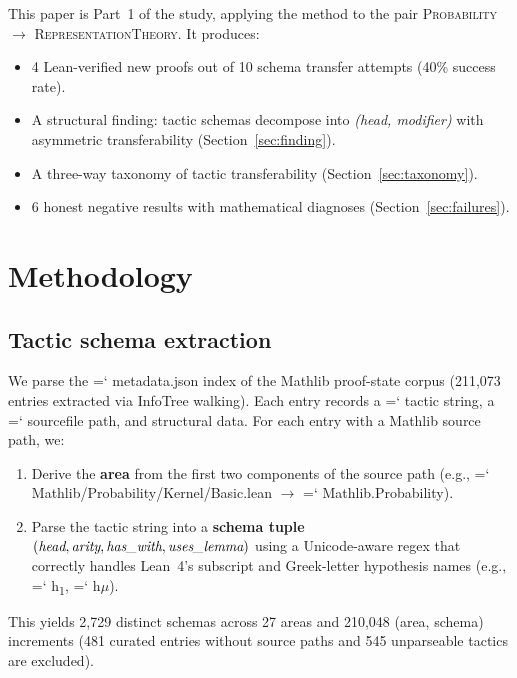 \documentclass[11pt]{article}
\renewcommand{\texttt}[1]{%
  \begingroup\ttfamily\hyphenchar\font=`\-\relax
  \def\_{\textunderscore\discretionary{}{}{}}%
  #1\endgroup}
\theoremstyle{definition}
\theoremstyle{remark}
\begin{document}
This paper is Part~1 of the study, applying the method to the pair
\textsc{Probability} $\to$ \textsc{RepresentationTheory}.  It produces:

\begin{itemize}
\item 4 Lean-verified new proofs out of 10 schema transfer
  attempts (40\% success rate).
\item A structural finding: tactic schemas decompose into
  \emph{(head, modifier)} with asymmetric transferability
  (Section~\ref{sec:finding}).
\item A three-way taxonomy of tactic transferability
  (Section~\ref{sec:taxonomy}).
\item 6 honest negative results with mathematical diagnoses
  (Section~\ref{sec:failures}).
\end{itemize}

\section{Methodology}\label{sec:method}

\subsection{Tactic schema extraction}\label{sec:extraction}

We parse the \texttt{metadata.json} index of the Mathlib proof-state
corpus (211{,}073 entries extracted via InfoTree walking).  Each entry
records a \texttt{tactic} string, a \texttt{source\_file} path, and
structural data.  For each entry with a Mathlib source path, we:

\begin{enumerate}
\item Derive the \textbf{area} from the first two components of the
  source path (e.g., \texttt{Mathlib/Probability/Kernel/Basic.lean}
  $\to$ \texttt{Mathlib.Probability}).
\item Parse the tactic string into a \textbf{schema tuple}
  $(\textit{head}, \textit{arity}, \textit{has\_with},
  \textit{uses\_lemma})$ using a Unicode-aware regex that correctly
  handles Lean~4's subscript and Greek-letter hypothesis names
  (e.g., \texttt{h\textsubscript{1}}, \texttt{h$\mu$}).
\end{enumerate}

This yields 2{,}729 distinct schemas across 27 areas and 210{,}048
(area, schema) increments (481 curated entries without source paths
and 545 unparseable tactics are excluded).
\end{document}
